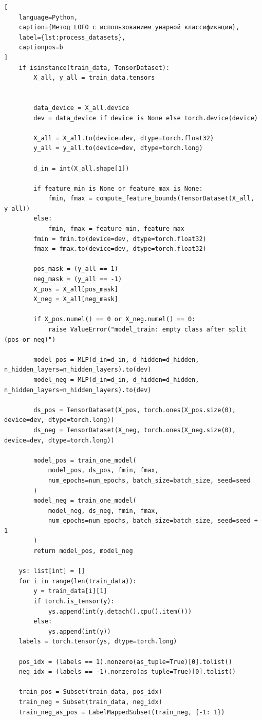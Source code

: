 \documentclass[12pt,a4paper]{article}
\begin{document}
\begin{lstlisting}[
    language=Python,
    caption={Метод LOFO с использованием унарной классификации},
    label={lst:process_datasets},
    captionpos=b
]
    if isinstance(train_data, TensorDataset):
        X_all, y_all = train_data.tensors


        data_device = X_all.device
        dev = data_device if device is None else torch.device(device)

        X_all = X_all.to(device=dev, dtype=torch.float32)
        y_all = y_all.to(device=dev, dtype=torch.long)

        d_in = int(X_all.shape[1])

        if feature_min is None or feature_max is None:
            fmin, fmax = compute_feature_bounds(TensorDataset(X_all, y_all))
        else:
            fmin, fmax = feature_min, feature_max
        fmin = fmin.to(device=dev, dtype=torch.float32)
        fmax = fmax.to(device=dev, dtype=torch.float32)

        pos_mask = (y_all == 1)
        neg_mask = (y_all == -1)
        X_pos = X_all[pos_mask]
        X_neg = X_all[neg_mask]

        if X_pos.numel() == 0 or X_neg.numel() == 0:
            raise ValueError("model_train: empty class after split (pos or neg)")

        model_pos = MLP(d_in=d_in, d_hidden=d_hidden, n_hidden_layers=n_hidden_layers).to(dev)
        model_neg = MLP(d_in=d_in, d_hidden=d_hidden, n_hidden_layers=n_hidden_layers).to(dev)

        ds_pos = TensorDataset(X_pos, torch.ones(X_pos.size(0), device=dev, dtype=torch.long))
        ds_neg = TensorDataset(X_neg, torch.ones(X_neg.size(0), device=dev, dtype=torch.long))

        model_pos = train_one_model(
            model_pos, ds_pos, fmin, fmax,
            num_epochs=num_epochs, batch_size=batch_size, seed=seed
        )
        model_neg = train_one_model(
            model_neg, ds_neg, fmin, fmax,
            num_epochs=num_epochs, batch_size=batch_size, seed=seed + 1
        )
        return model_pos, model_neg

    ys: list[int] = []
    for i in range(len(train_data)):
        y = train_data[i][1]
        if torch.is_tensor(y):
            ys.append(int(y.detach().cpu().item()))
        else:
            ys.append(int(y))
    labels = torch.tensor(ys, dtype=torch.long)

    pos_idx = (labels == 1).nonzero(as_tuple=True)[0].tolist()
    neg_idx = (labels == -1).nonzero(as_tuple=True)[0].tolist()

    train_pos = Subset(train_data, pos_idx)
    train_neg = Subset(train_data, neg_idx)
    train_neg_as_pos = LabelMappedSubset(train_neg, {-1: 1})


\end{lstlisting}
\end{document}
